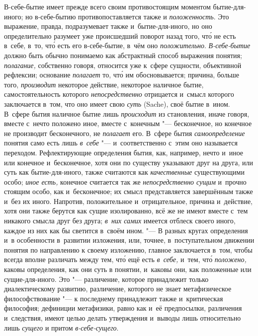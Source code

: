В-себе-бытие имеет прежде всего своим противостоящим моментом
бытие-для-иного; но в-себе-бытию противопоставляется также и
{\em положенность}. Это выражение, правда,
подразумевает также и~бытие-для-иного, но оно определительно разумеет уже
происшедший поворот назад того, чт\'{о} не есть в~себе, в~то, чт\'{о} есть его
в-себе-бытие, в~чём оно {\em положительно}.
{\em В-себе-бытие} должно быть обычно понимаемо как
абстрактный способ выражения понятия; {\em полагание,}
собственно говоря, относится уже к~сфере сущности, объективной рефлексии;
основание {\em полагает} то, чт\'{о} им обосновывается;
причина, больше того, {\em производит} некоторое
действие, некоторое наличное бытие, самостоятельность которого
{\em непосредственно} отрицается и~смысл которого
заключается в~том, что оно имеет свою {\em суть}
(Sache), своё бытие в~ином. В~сфере бытия наличное бытие лишь
{\em происходит} из становления, иначе говоря, вместе с~нечто
положено иное, вместе с~конечным "--- бесконечное, но конечное не
производит бесконечного, не {\em полагает} его. В~сфере
бытия {\em самоопределение} понятия само есть лишь
{\em в~себе} "--- и~соответственно с~этим оно называется
переходом. Рефлектирующие определения бытия, как, например, нечто и~иное
или конечное и~бесконечное, хотя они по существу указывают друг на друга,
или суть как бытие-для-иного, также считаются как
{\em качественные} существующими особо;
{\em иное есть,} конечное считается так же
{\em непосредственно сущим} и~прочно стоящим особо, как
и~бесконечное; их смысл представляется завершённым также и~без их иного.
Напротив, положительное и~отрицательное, причина и~действие, хотя они также
берутся как сущие изолированно, всё же не имеют вместе с~тем никакого
смысла друг без друга; {\em в~них самих} имеется
отблеск своего иного, каждое из них как бы светится в~своём ином. "--- В
разных кругах определения и~в особенности в~развитии
изложения, или, точнее, в~поступательном движении понятия по направлению к
своему изложению, главное заключается в~том, чтобы всегда вполне различать
между тем, чт\'{о} ещё есть {\em в~себе,} и~тем, чт\'{о}
{\em положено,} каковы определения, как они суть в
понятии, и~каковы они, как положенные или сущие-для-иного. Это
"--- различение, которое принадлежит только диалектическому развитию,
различение, которого не знает метафизическое философствование "--- к
последнему принадлежит также и~критическая философия; дефиниции метафизики,
равно как и~её предпосылки, различения и~следствия, имеют целью делать
утверждения и~выводы лишь относительно лишь {\em сущего} и
притом {\em в-себе-сущего}.

